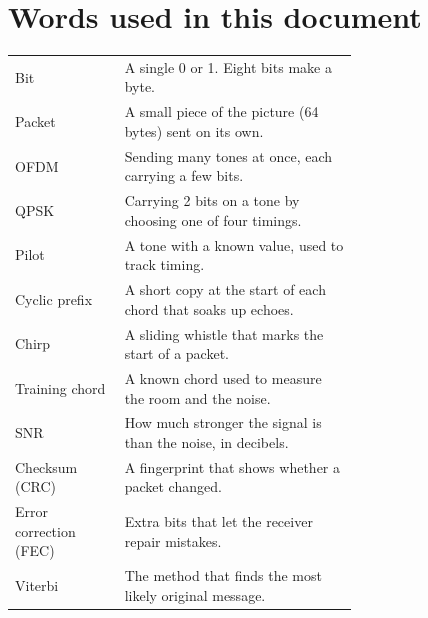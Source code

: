 \documentclass[12pt,a4paper]{article}
\begin{document}
\section*{Words used in this document}

\begin{center}
\begin{tabular}{@{}lp{0.68\linewidth}@{}}
\toprule
Bit & A single 0 or 1. Eight bits make a byte. \\
Packet & A small piece of the picture (64 bytes) sent on its own. \\
OFDM & Sending many tones at once, each carrying a few bits. \\
QPSK & Carrying 2 bits on a tone by choosing one of four timings. \\
Pilot & A tone with a known value, used to track timing. \\
Cyclic prefix & A short copy at the start of each chord that soaks up echoes. \\
Chirp & A sliding whistle that marks the start of a packet. \\
Training chord & A known chord used to measure the room and the noise. \\
SNR & How much stronger the signal is than the noise, in decibels. \\
Checksum (CRC) & A fingerprint that shows whether a packet changed. \\
Error correction (FEC) & Extra bits that let the receiver repair mistakes. \\
Viterbi & The method that finds the most likely original message. \\
\bottomrule
\end{tabular}
\end{center}
\end{document}
